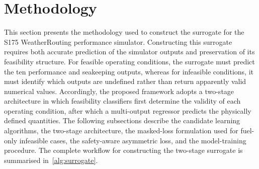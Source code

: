 \documentclass[final,5p,times,twocolumn,numbers]{elsarticle}
\begin{document}
\section{Methodology}\label{sec:method}
This section presents the methodology used to construct the surrogate for the S175 WeatherRouting performance simulator. Constructing this surrogate requires both accurate prediction of the simulator outputs and preservation of its feasibility structure. For feasible operating conditions, the surrogate must predict the ten performance and seakeeping outputs, whereas for infeasible conditions, it must identify which outputs are undefined rather than return apparently valid numerical values. Accordingly, the proposed framework adopts a two-stage architecture in which feasibility classifiers first determine the validity of each operating condition, after which a multi-output regressor predicts the physically defined quantities. The following subsections describe the candidate learning algorithms, the two-stage architecture, the masked-loss formulation used for fuel-only infeasible cases, the safety-aware asymmetric loss, and the model-training procedure. The complete workflow for constructing the two-stage surrogate is summarised in~\autoref{alg:surrogate}.
\end{document}
